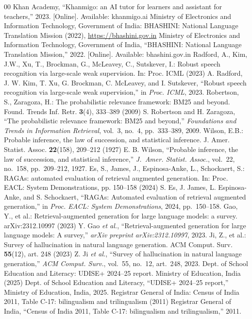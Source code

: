 \begin{thebibliography}{00}
\else{} Khan Academy, ``Khanmigo: an AI tutor for learners and assistant for teachers,'' 2023. [Online]. Available: khanmigo.ai\fi
\ifspringer{} Ministry of Electronics and Information Technology, Government of India: BHASHINI: National Language Translation Mission (2022), \url{https://bhashini.gov.in}
\else{} Ministry of Electronics and Information Technology, Government of India, ``BHASHINI: National Language Translation Mission,'' 2022. [Online]. Available: bhashini.gov.in\fi
\ifshort\else  %
\ifspringer{} Radford, A., Kim, J.W., Xu, T., Brockman, G., McLeavey, C., Sutskever, I.: Robust speech recognition via large-scale weak supervision. In: Proc. ICML (2023)
\else{} A. Radford, J. W. Kim, T. Xu, G. Brockman, C. McLeavey, and I. Sutskever, ``Robust speech recognition via large-scale weak supervision,'' in \textit{Proc. ICML}, 2023.\fi
\fi
\ifspringer{} Robertson, S., Zaragoza, H.: The probabilistic relevance framework: BM25 and beyond. Found. Trends Inf. Retr. \textbf{3}(4), 333--389 (2009)
\else{} S. Robertson and H. Zaragoza, ``The probabilistic relevance framework: BM25 and beyond,'' \textit{Foundations and Trends in Information Retrieval}, vol.~3, no.~4, pp.~333--389, 2009.\fi
\ifspringer{} Wilson, E.B.: Probable inference, the law of succession, and statistical inference. J. Amer. Statist. Assoc. \textbf{22}(158), 209--212 (1927)
\else{} E. B. Wilson, ``Probable inference, the law of succession, and statistical inference,'' \textit{J.~Amer. Statist. Assoc.}, vol.~22, no.~158, pp.~209--212, 1927.\fi
\ifspringer{} Es, S., James, J., Espinosa-Anke, L., Schockaert, S.: RAGAs: automated evaluation of retrieval augmented generation. In: Proc. EACL: System Demonstrations, pp. 150--158 (2024)
\else{} S. Es, J. James, L. Espinosa-Anke, and S. Schockaert, ``RAGAs: Automated evaluation of retrieval augmented generation,'' in \textit{Proc. EACL: System Demonstrations}, 2024, pp.~150--158.\fi
\ifspringer{} Gao, Y., et al.: Retrieval-augmented generation for large language models: a survey. arXiv:2312.10997 (2023)
\else{} Y. Gao \textit{et al.}, ``Retrieval-augmented generation for large language models: A survey,'' \textit{arXiv preprint arXiv:2312.10997}, 2023.\fi
\ifspringer{} Ji, Z., et al.: Survey of hallucination in natural language generation. ACM Comput. Surv. \textbf{55}(12), art. 248 (2023)
\else{} Z. Ji \textit{et al.}, ``Survey of hallucination in natural language generation,'' \textit{ACM Comput. Surv.}, vol.~55, no.~12, art.~248, 2023.\fi
\ifspringer{} Dept. of School Education and Literacy: UDISE+ 2024--25 report. Ministry of Education, India (2025)
\else{} Dept. of School Education and Literacy, ``UDISE+ 2024--25 report,'' Ministry of Education, India, 2025.\fi
\ifspringer{} Registrar General of India: Census of India 2011, Table C-17: bilingualism and trilingualism (2011)
\else{} Registrar General of India, ``Census of India 2011, Table C-17: bilingualism and trilingualism,'' 2011.\fi
\end{thebibliography}
\endgroup


